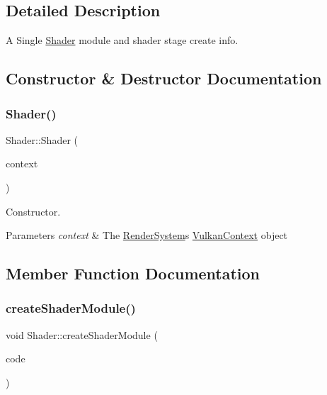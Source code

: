 \subsection{Detailed Description}
A Single \mbox{\hyperlink{class_shader}{Shader}} module and shader stage create info. 

\subsection{Constructor \& Destructor Documentation}
\mbox{\label{class_shader_ac7ee3d9c3c847af0280af86264a2293a}} 
\subsubsection{\texorpdfstring{Shader()}{Shader()}}
{\footnotesize\ttfamily Shader\+::\+Shader (\begin{DoxyParamCaption}\item[{std\+::shared\+\_\+ptr$<$ \mbox{\hyperlink{class_vulkan_context}{Vulkan\+Context}} $>$}]{context }\end{DoxyParamCaption})}



Constructor. 


\begin{DoxyParams}{Parameters}
{\em context} & The \mbox{\hyperlink{class_render_system}{Render\+System}}\textquotesingle{}s \mbox{\hyperlink{class_vulkan_context}{Vulkan\+Context}} object \\
\hline
\end{DoxyParams}


\subsection{Member Function Documentation}
\mbox{\label{class_shader_ad2d07a27f021556943102da0479a9e08}} 
\subsubsection{\texorpdfstring{createShaderModule()}{createShaderModule()}}
{\footnotesize\ttfamily void Shader\+::create\+Shader\+Module (\begin{DoxyParamCaption}\item[{const std\+::vector$<$ char $>$ \&}]{code }\end{DoxyParamCaption})\hspace{0.3cm}{\ttfamily [protected]}}



